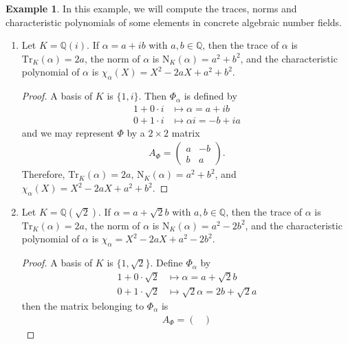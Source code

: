 \documentclass[a4paper]{book}
\theoremstyle{definition}
\newtheorem{example}{Example}[definition]
\begin{document}
\begin{example}
    In this example, we will compute the traces, norms and characteristic polynomials of some elements in concrete algebraic number fields.
    \begin{enumerate}
    \item Let \(K = \mathbb{Q}(i)\). If \(\alpha = a + ib\) with \(a, b \in \mathbb{Q}\), then the trace of \(\alpha\) is \(\mathrm{Tr}_K(\alpha) = 2a\), the norm of \(\alpha\) is \(\mathrm{N}_K(\alpha) = a^2 + b^2\), and the characteristic polynomial of \(\alpha\) is \(\chi_\alpha (X) = X^2 - 2a X + a^2 + b^2\).
    \begin{proof}
        A basis of \(K\) is \(\{1, i\}\). Then \(\Phi_\alpha\) is defined by
        \begin{align*}
            1 + 0 \cdot i &\mapsto \alpha = a + ib\\
            0 + 1 \cdot i &\mapsto \alpha i = -b + i a
        \end{align*}
        and we may represent \(\Phi\) by a \(2 \times 2\) matrix
        \begin{align*}
            A_\Phi = \begin{pmatrix}
                a & -b \\ b & a
            \end{pmatrix} \text{.}
        \end{align*}
        Therefore, \(\mathrm{Tr}_K(\alpha) = 2a\), \(\mathrm{N}_K(\alpha) = a^2 + b^2\), and \(\chi_\alpha (X) = X^2 - 2a X + a^2 + b^2\).
    \end{proof}
    \item Let \(K = \mathbb{Q}(\sqrt{2})\). If \(\alpha = a + \sqrt{2}b\) with \(a, b \in \mathbb{Q}\), then the trace of \(\alpha\) is \(\mathrm{Tr}_K(\alpha) = 2a\), the norm of \(\alpha\) is \(\mathrm{N}_K(\alpha) = a^2 - 2b^2\), and the characteristic polynomial of \(\alpha\) is \(\chi_\alpha = X^2 - 2a X + a^2 - 2b^2\).
    \begin{proof}
        A basis of \(K\) is \(\{1, \sqrt{2}\}\). Define \(\Phi_\alpha\) by
        \begin{align*}
            1 + 0 \cdot \sqrt{2} &\mapsto \alpha = a + \sqrt{2} b \\
            0 + 1 \cdot \sqrt{2} &\mapsto \sqrt{2} \alpha = 2b + \sqrt{2}a
        \end{align*}
        then the matrix belonging to \(\Phi_\alpha\) is
        \begin{align*}
            A_\Phi = \begin{pmatrix}

\end{pmatrix}
\end{align*}
\end{proof}
\end{enumerate}
\end{example}
\end{document}
